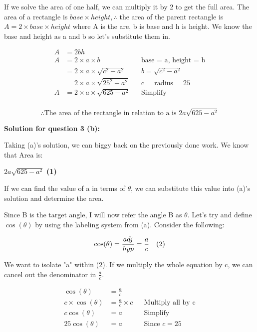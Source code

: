 \documentclass[12pt]{book}
\begin{document}
\begin{enumerate}
\vspace{0.3cm}
If we solve the area of one half, we can multiply it by 2 to get the full area. 
The area of a rectangle is $base \times height, \therefore$ the area of the parent rectangle 
is $A = 2\times base \times height$ where A is the are, b is base and h is height. We know the base and height as a and b 
so let's substitute them in. 

\begin{align*}
    A &= 2bh \\
    A &= 2\times a \times b && \text{base = a, height = b} \\
    &= 2\times a \times \sqrt{c^2 - a^2} && b = \sqrt{c^2 - a^2} \\
    &= 2\times a \times \sqrt{25^2 - a^2} && \text{c = radius = 25} \\
    A &= 2\times a \times \sqrt{625 - a^2} && \text{Simplify} \\
\end{align*}

\vspace{-1cm}
$$\boxed{\therefore \text{The area of the rectangle in relation to a is } 2a\sqrt{625 - a^2}}$$

\vspace{0.5cm}
\textbf{Solution for question 3 (b):}

\vspace{0.3cm}
Taking (a)'s solution, we can biggy back on the previously done work. We know that 
Area is:

\begin{center}
    $2a\sqrt{625 - a^2}$ \textbf{(1)} 
\end{center}

\vspace{0.2cm}
If we can find the value of a in terms of $\theta$, 
we can substitute this value into (a)'s solution and determine the area.

\vspace{0.3cm}
Since B is the target angle, I will now refer the angle B as $\theta$. 
Let's try and define $\cos(\theta)$ by using the labeling system from (a). 
Consider the following:

$$\cos(\theta) = \frac{adj}{hyp} = \frac{a}{c} \text{\space \space \space (2)}$$

We want to isolate "a" within (2). If we multiply the whole equation by c, we can 
cancel out the denominator in $\frac{a}{c}$.

\begin{align*}
    \cos(\theta) &= \frac{a}{c} \\
    c \times \cos(\theta) &= \frac{a}{c} \times c && \text{Multiply all by c}\\
    c\cos(\theta) &= a && \text{Simplify}\\
    25\cos(\theta) &= a && \text{Since } c = 25\\
\end{align*}


\end{enumerate}
\end{document}

